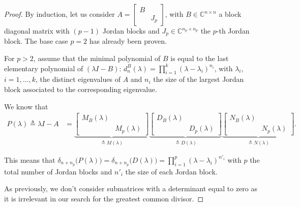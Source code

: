 \documentclass[11pt]{article}
\newcommand{\complex}{\mathbb{C}} %
\begin{document}
\begin{proof}
By induction, let us consider $A=\left[\begin{smallmatrix}
B & \\
 & J_p
\end{smallmatrix}\right]$, with $B \in \complex^{n\times n}$ a block diagonal matrix with $(p-1)$ Jordan blocks and $J_p\in \complex^{n_p\times n_p}$ the \(p\)-th Jordan block.
The base case $p = 2$ has already been proven.

For $p > 2$, assume that the minimal polynomial of $B$ is equal to the last elementary polynomial of $(\lambda I - B)$: $d_{n}^{B}(\lambda) = \prod_{i = 1}^k (\lambda - \lambda_i)^{n_i}$, with $\lambda_i$, $i= 1, \dots, k$, the distinct eigenvalues of \(A\) and $n_i$ the size of the largest Jordan block associated to the corresponding eigenvalue.

We know that
\begin{align*}
P(\lambda)\triangleq\lambda I - A 
&= \underbrace{\begin{bmatrix}
M_{B}(\lambda) & \\
& M_{p}(\lambda)
\end{bmatrix}}_{\triangleq M(\lambda)}\underbrace{\begin{bmatrix}
D_{B}(\lambda) & \\
& D_{p}(\lambda)
\end{bmatrix}}_{\triangleq D(\lambda)}\underbrace{\begin{bmatrix}
N_{B}(\lambda) & \\
& N_{p}(\lambda)
\end{bmatrix}}_{\triangleq N(\lambda)}.
\end{align*}

This means that $\delta_{n+n_p}\big(P(\lambda)\big) = \delta_{n+n_p}\big(D(\lambda)\big) = \prod_{i = 1}^p (\lambda - \lambda_i)^{n'_i}$ with $p$ the total number of Jordan blocks and $n'_i$ the size of each Jordan block.

As previously, we don't consider submatrices with a determinant equal to zero as it is irrelevant in our search for the greatest common divisor.


\end{proof}
\end{document}
